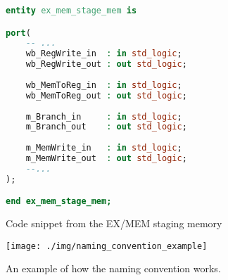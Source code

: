 \begin{figure}[H]
\begin{lstlisting}[language=VHDL]
entity ex_mem_stage_mem is

port(
	-- ...
    wb_RegWrite_in 	: in std_logic;
    wb_RegWrite_out : out std_logic;
    
    wb_MemToReg_in 	: in std_logic;
    wb_MemToReg_out : out std_logic;
    
    m_Branch_in		: in std_logic;
    m_Branch_out	: out std_logic;
    
    m_MemWrite_in	: in std_logic;
    m_MemWrite_out  : out std_logic;
	--... 
);

end ex_mem_stage_mem;
\end{lstlisting}
\caption{Code snippet from the EX/MEM staging memory}
\label{code:staging_memory_ex}
\end{figure}

\begin{figure}[H]
	\texttt{[image: ./img/naming\_convention\_example]}
	\caption{An example of how the naming convention works.}
	\label{naming_convention_expamle}
\end{figure}




